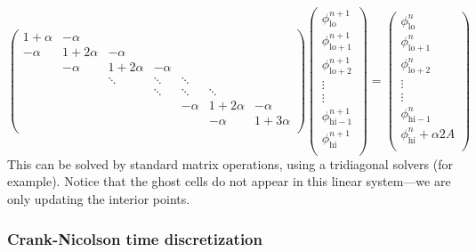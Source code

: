 \begin{equation}
\renewcommand\arraystretch{1.5}
\left (
\begin{array}{ccccccc}
1+\alpha &   -\alpha &           &        &         &           &          \\
-\alpha  & 1+2\alpha & -\alpha   &        &         &           &          \\
         & -\alpha   & 1+2\alpha & -\alpha&         &           &          \\
         &           & \ddots    & \ddots & \ddots  &           &          \\
         &           &           & \ddots & \ddots  & \ddots    &          \\
         &           &           &        & -\alpha & 1+2\alpha &-\alpha   \\
         &           &           &        &         & -\alpha   &1+3\alpha \\
\end{array}
\right )
\left (
\begin{array}{c}
\phi_\mathrm{lo}^{n+1} \\
\phi_\mathrm{lo+1}^{n+1} \\
\phi_\mathrm{lo+2}^{n+1} \\
\vdots \\
\vdots \\
\phi_\mathrm{hi-1}^{n+1} \\
\phi_\mathrm{hi}^{n+1} \\
\end{array}
\right )
=
\left (
\begin{array}{c}
\phi_\mathrm{lo}^{n} \\
\phi_\mathrm{lo+1}^{n} \\
\phi_\mathrm{lo+2}^{n} \\
\vdots \\
\vdots \\
\phi_\mathrm{hi-1}^{n} \\
\phi_\mathrm{hi}^{n} + \alpha 2 A\\
\end{array}
\right )
\end{equation}
This can be solved by standard matrix operations, using a tridiagonal
solvers (for example).  Notice that the ghost cells do not appear in this
linear system---we are only updating the interior points.

\subsubsection{Crank-Nicolson time discretization}

